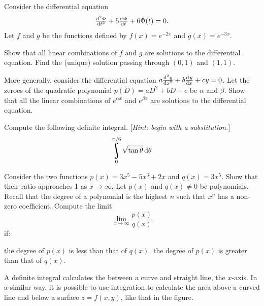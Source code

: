 \begin{questions}
\begin{parts}
      \parS Consider the differential equation
            \begin{displaymath}
              \od[2]{\Phi}{t} + 5\od{\Phi}{t} + 6\Phi(t) = 0.
            \end{displaymath}
            Let $ f $ and $ g $ be the functions defined by $ f(x) = e^{-2x} $ and $ g(x) = e^{-3x} $.
            \begin{subparts}
              \subpart Show that all linear combinations of $ f $ and $ g $ are solutions to the differential equation.
              \subpart Find the (unique) solution passing through $ (0,1) $ and $ (1,1) $.
            \end{subparts}
      \parO More generally, consider the differential equation $ a\od[2]{y}{x} + b\od{y}{x} + cy = 0 $. Let
            the zeroes of the quadratic polynomial $ p(D) = aD^2 + bD + c $ be $ \alpha $ and $ \beta $. Show
            that all the linear combinations of $ e^{\alpha x} $ and $ e^{\beta x} $ are solutions to the differential
            equation.
    \end{parts}
  \questioS Compute the following definite integral. [\textit{Hint: begin with a substitution.}]
            \begin{displaymath}
              \rint_0^{\pi/6} \sqrt{\tan \theta} \dif{\theta}
            \end{displaymath}
  \question
    \begin{parts}
      \parE Consider the two functions $ p(x) = 3x^5 - 5x^3 + 2x $ and $ q(x) = 3x^5 $. Show that their ratio approaches
            1 as $ x \to \infty $.
      \parS Let $ p(x) $ and $ q(x) \neq 0 $ be polynomials. Recall that the degree of a polynomial is the highest $ n $ such that $ x^n $
            has a non-zero coefficient. Compute the limit
            \begin{displaymath}
              \lim_{x \to \infty} \frac{p(x)}{q(x)}
            \end{displaymath}
            if:
        \begin{subparts}
          \subpart the degree of $ p(x) $ is less than that of $ q(x) $.
          \subpart the degree of $ p(x) $ is greater than that of $ q(x) $.
        \end{subparts}
    \end{parts}
  \questioS A definite integral calculates the between a curve and straight line, the $ x$-axis. In a similar way, it is possible
            to use integration to calculate the area above a curved line and below a surface $ z = f(x,y) $, like that in the figure.

\end{questions}
